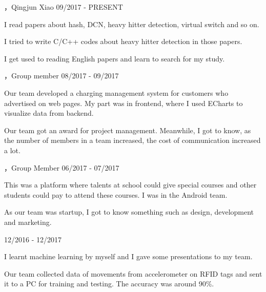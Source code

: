 \vspace{-6.0mm}

\begin{cventries}

\cvexperience
{，Qingjun Xiao}
{09/2017 - PRESENT}
{
    \begin{cvitems}
    \item {I read papers about hash, DCN, heavy hitter detection, virtual switch and so on.}
    \item {I tried to write C/C++ codes about heavy hitter detection in those papers.}
    \item {I get used to reading English papers and learn to search for my study.}
    \end{cvitems}
}

\cvexperience
{，Group member}
{08/2017 - 09/2017}
{
    \begin{cvitems}
    \item {Our team developed a charging management system for customers who advertised on web pages. My part was in frontend, where I used ECharts to visualize data from backend.}
    \item {Our team got an award for project management. Meanwhile, I got to know, as the number of members in a team increased, the cost of communication increased a lot.}
    \end{cvitems}
}

\cvexperience
{，Group Member}
{06/2017 - 07/2017}
{
    \begin{cvitems}
    \item {This was a platform where talents at school could give special courses and other students could pay to attend these courses. I was in the Android team.}
    \item {As our team was startup, I got to know something such as design, development and marketing.}
    \end{cvitems}
}

 \cvexperience
 {}
 {12/2016 - 12/2017}
 {
     \begin{cvitems}
     \item {I learnt machine learning by myself and I gave some presentations to my team.}
     \item {Our team collected data of movements from accelerometer on RFID tags and sent it to a PC for training and testing. The accuracy was around 90\%.}
     \end{cvitems}
 }
\end{cventries}